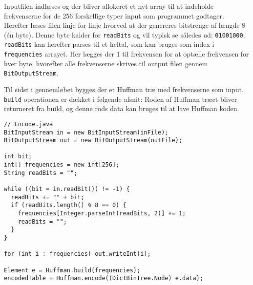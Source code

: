 \documentclass{article}
\begin{document}
Inputfilen indlæses og der bliver allokeret et nyt array til at indeholde frekvenserne for de 256 forskellige typer input som programmet godtager. Herefter læses filen linje for linje hvorved at der genereres bitstrenge af længde 8 (én byte). Denne byte kalder for \texttt{readBits} og vil typisk se således ud: \texttt{01001000}. \texttt{readBits} kan herefter parses til et heltal, som kan bruges som index i \texttt{frequencies} arrayet. Her lægges der 1 til frekvensen for at optælle frekvensen for hver byte, hvorefter alle frekvenserne skrives til output filen gennem \texttt{BitOutputStream}.

Til sidst i gennemløbet bygges der et Huffman træ med frekvenserne som input. \texttt{build} operationen er dækket i følgende afsnit: %
Roden af Huffman træet bliver returneret fra build, og denne rods data kan bruges til at lave Huffman koden.

\begin{lstlisting}
// Encode.java
BitInputStream in = new BitInputStream(inFile);
BitOutputStream out = new BitOutputStream(outFile);

int bit;
int[] frequencies = new int[256];
String readBits = "";

while ((bit = in.readBit()) != -1) {
  readBits += "" + bit;
  if (readBits.length() % 8 == 0) {
    frequencies[Integer.parseInt(readBits, 2)] += 1;
    readBits = "";
  }
}

for (int i : frequencies) out.writeInt(i);

Element e = Huffman.build(frequencies);
encodedTable = Huffman.encode((DictBinTree.Node) e.data);
\end{lstlisting}

\newpage
\end{document}
